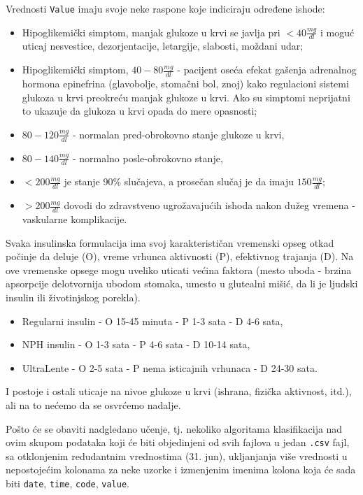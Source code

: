 \documentclass[fontsize=12bp, paper=a4]{scrarticle}
\begin{document}
Vrednosti \verb|Value| imaju svoje neke raspone koje indiciraju određene ishode:
\begin{itemize}
    \itemsep0em
    \item Hipoglikemički simptom, manjak glukoze u krvi se javlja pri $<40 \frac{mg}{dl}$ i moguć uticaj nesvestice, dezorjentacije, letargije, slabosti, moždani udar;
    \item Hipoglikemički simptom, $40 - 80 \frac{mg}{dl}$ - pacijent oseća efekat gašenja adrenalnog hormona epinefrina (glavobolje, stomačni bol, znoj) kako regulacioni sistemi glukoza u krvi preokreću manjak glukoze u krvi. Ako su simptomi neprijatni to ukazuje da glukoza u krvi opada do mere opasnosti;
    \item $80 - 120 \frac{mg}{dl}$ - normalan pred-obrokovno stanje glukoze u krvi,
    \item $80 - 140 \frac{mg}{dl}$ - normalno posle-obrokovno stanje,
    \item $<200\frac{mg}{dl}$ je stanje 90\% slučajeva, a prosečan slučaj je da imaju $150\frac{mg}{dl}$;
    \item $>200\frac{mg}{dl}$ dovodi do zdravstveno ugrožavajućih ishoda nakon dužeg vremena - vaskularne komplikacije.
\end{itemize}

Svaka insulinska formulacija ima svoj karakterističan vremenski opseg otkad počinje da deluje (O), vreme vrhunca aktivnosti (P), efektivnog trajanja (D). Na ove vremenske opsege mogu uveliko uticati većina faktora (mesto uboda - brzina apsorpcije delotvornija ubodom stomaka, umesto u glutealni mišić, da li je ljudski insulin ili životinjskog porekla).
\begin{itemize}
    \itemsep0em
    \item Regularni insulin - O 15-45 minuta - P 1-3 sata - D 4-6 sata,
    \item NPH insulin - O 1-3 sata - P 4-6 sata - D 10-14 sata,
    \item UltraLente - O 2-5 sata -  P nema isticajnih vrhunaca - D 24-30 sata.
\end{itemize}

I postoje i ostali uticaje na nivoe glukoze u krvi (ishrana, fizička aktivnost, itd.), ali na to nećemo da se osvrćemo nadalje.

\vbox{}

Pošto će se obaviti nadgledano učenje, tj. nekoliko algoritama klasifikacija nad ovim skupom podataka koji će biti objedinjeni od svih fajlova u jedan \texttt{.csv} fajl, sa otklonjenim redudantnim vrednostima (31. jun), ukljanjanja više vrednosti u nepostojećim kolonama za neke uzorke i izmenjenim imenima kolona koja će sada biti \verb|date|,  \verb|time|, \verb|code|, \verb|value|.
\end{document}
